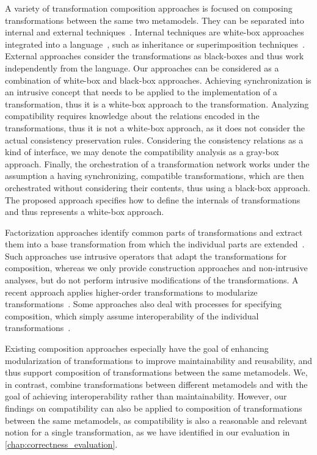 A variety of transformation composition approaches is focused on composing transformations between the same two metamodels.
They can be separated into internal and external techniques~\cite{wagelaar2008a}.
Internal techniques are white-box approaches integrated into a language~\cite{wagelaar2011a}, such as inheritance or superimposition techniques~\cite{wagelaar2010a}.
External approaches consider the transformations as black-boxes and thus work independently from the language. 
Our approaches can be considered as a combination of white-box and black-box approaches.
Achieving synchronization is an intrusive concept that needs to be applied to the implementation of a transformation, thus it is a white-box approach to the transformation.
Analyzing compatibility requires knowledge about the relations encoded in the transformations, thus it is not a white-box approach, as it does not consider the actual consistency preservation rules. Considering the consistency relations as a kind of interface, we may denote the compatibility analysis as a gray-box approach.
Finally, the orchestration of a transformation network works under the assumption a having synchronizing, compatible transformations, which are then orchestrated without considering their contents, thus using a black-box approach.
The proposed \commonalities approach specifies how to define the internals of transformations and thus represents a white-box approach.

Factorization approaches identify common parts of transformations and extract them into a base transformation from which the individual parts are extended~\cite{cuadrado2008a}.
Such approaches use intrusive operators that adapt the transformations for composition, whereas we only provide construction approaches and non-intrusive analyses, but do not perform intrusive modifications of the transformations.
A recent approach applies higher-order transformations to modularize transformations~\cite{fleck2017transformationModularization-TSE}.
Some approaches also deal with processes for specifying composition, which simply assume interoperability of the individual transformations~\cite{oldevik2005a}.

Existing composition approaches especially have the goal of enhancing modularization of transformations to improve maintainability and reusability, and thus support composition of transformations between the same metamodels. 
We, in contrast, combine transformations between different metamodels and with the goal of achieving interoperability rather than maintainability.
However, our findings on compatibility can also be applied to composition of transformations between the same metamodels, as compatibility is also a reasonable and relevant notion for a single transformation, as we have identified in our evaluation in \autoref{chap:correctness_evaluation}.


